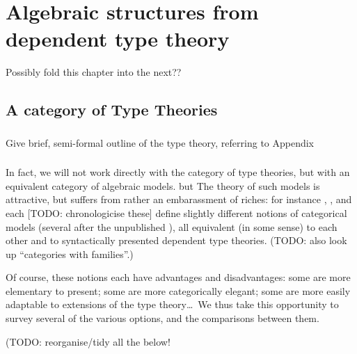 
\chapter{Algebraic structures from dependent type theory}



Possibly fold this chapter into the next??

\section{A category of Type Theories}

\subsection*{}Give brief, semi-formal outline of the type theory, referring to Appendix

\subsection*{}In fact, we will not work directly with the category of type theories, but with an equivalent category of algebraic models.
but 
The theory of such models is attractive, but suffers from rather an embarassment of riches: for instance \cite{jacobs:comprehension-categories}, \cite{pitts:categorical-logic}, \cite{hofmann:syntax-and-semantics} and \cite{dybjer:internal-type-theory} each [TODO: chronologicise these] define slightly different notions of categorical models (several after the unpublished \cite{cartmell:thesis}), all equivalent (in some sense) to each other and to syntactically presented dependent type theories.   (TODO: also look up ``categories with families''.)

Of course, these notions each have advantages and disadvantages: some are more elementary to present; some are more categorically elegant; some are more easily adaptable to extensions of the type theory\ldots\  We thus take this opportunity to survey several of the various options, and the comparisons between them.

(TODO: reorganise/tidy all the below! 

